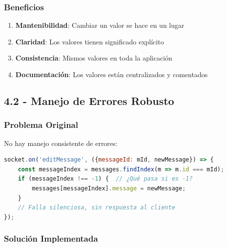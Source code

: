 \documentclass[12pt,a4paper]{article}
\begin{document}
\subsubsection{Beneficios}
\begin{enumerate}
    \item \textbf{Mantenibilidad}: Cambiar un valor se hace en un lugar
    \item \textbf{Claridad}: Los valores tienen significado explícito
    \item \textbf{Consistencia}: Mismos valores en toda la aplicación
    \item \textbf{Documentación}: Los valores están centralizados y comentados
\end{enumerate}

\subsection{4.2 - Manejo de Errores Robusto}

\subsubsection{Problema Original}
No hay manejo consistente de errores:

\begin{lstlisting}[caption=Problema Original - Sin Manejo de Errores, language=JavaScript]
socket.on('editMessage', ({messageId: mId, newMessage}) => {
    const messageIndex = messages.findIndex(m => m.id === mId);
    if (messageIndex !== -1) {  // ¿Qué pasa si es -1?
        messages[messageIndex].message = newMessage;
    }
    // Falla silenciosa, sin respuesta al cliente
});
\end{lstlisting}

\subsubsection{Solución Implementada}
\end{document}
